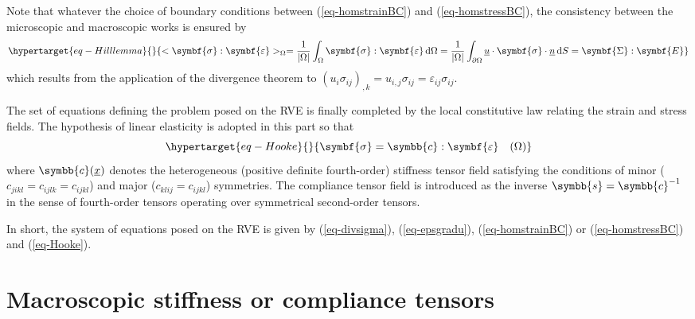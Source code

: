 \documentclass[
  letterpaper,
  DIV=11,
  numbers=noendperiod]{scrreprt}
\newcommand{\uu}[1]{{\symbf{{#1}}}}
\newcommand{\uuuu}[1]{{\symbb{{#1}}}}
\newcommand{\uv}[1]{{\underline{{#1}}}}
\newcommand{\x}{{\uv{{x}}}}
\newcommand{\n}{{\uv{{n}}}}
\newcommand{\eps}{{\uu{{\varepsilon}}}}
\newcommand{\E}{{\uu{{E}}}}
\newcommand{\sig}{{\uu{{\sigma}}}}
\newcommand{\Sig}{{\uu{{\Sigma}}}}
\newcommand{\ud}{{\,\mathrm{d}}}
\begin{document}
\begin{tcolorbox}[enhanced jigsaw, toprule=.15mm, breakable, coltitle=black, titlerule=0mm, rightrule=.15mm, toptitle=1mm, left=2mm, opacityback=0, opacitybacktitle=0.6, title=\textcolor{quarto-callout-note-color}{\faInfo}\hspace{0.5em}{Hill lemma}, colback=white, colbacktitle=quarto-callout-note-color!10!white, bottomrule=.15mm, arc=.35mm, bottomtitle=1mm, leftrule=.75mm, colframe=quarto-callout-note-color-frame]

Note that whatever the choice of boundary conditions between
(\ref{eq-homstrainBC}) and (\ref{eq-homstressBC}), the consistency
between the microscopic and macroscopic works is ensured by
\begin{equation}\protect\hypertarget{eq-Hilllemma}{}{
<\sig:\eps>_{\Omega}
=\frac{1}{\lvert \Omega \rvert}\int_\Omega \sig:\eps\ud \Omega
=\frac{1}{\lvert \Omega \rvert}\int_{\partial\Omega} \uv{u}\cdot\sig\cdot\n \ud S
=\Sig:\E
}\label{eq-Hilllemma}\end{equation} which results from the application
of the divergence theorem to
\((u_i\sigma_{ij})_{,k}=u_{i,j}\sigma_{ij}=\varepsilon_{ij}\sigma_{ij}\).

\end{tcolorbox}

The set of equations defining the problem posed on the RVE is finally
completed by the local constitutive law relating the strain and stress
fields. The hypothesis of linear elasticity is adopted in this part so
that \begin{equation}\protect\hypertarget{eq-Hooke}{}{
\sig=\uuuu{c}:\eps \quad(\Omega)
}\label{eq-Hooke}\end{equation} where \(\uuuu{c}(\x)\) denotes the
heterogeneous (positive definite fourth-order) stiffness tensor field
satisfying the conditions of minor (\(c_{jikl}=c_{ijlk}=c_{ijkl}\)) and
major (\(c_{klij}=c_{ijkl}\)) symmetries. The compliance tensor field is
introduced as the inverse \(\uuuu{s}=\uuuu{c}^{-1}\) in the sense of
fourth-order tensors operating over symmetrical second-order tensors.

In short, the system of equations posed on the RVE is given by
(\ref{eq-divsigma}), (\ref{eq-epsgradu}), (\ref{eq-homstrainBC}) or
(\ref{eq-homstressBC}) and (\ref{eq-Hooke}).

\hypertarget{sec-basics_elas_mac_stiff}{%
\section{Macroscopic stiffness or compliance
tensors}\label{sec-basics_elas_mac_stiff}}
\end{document}
